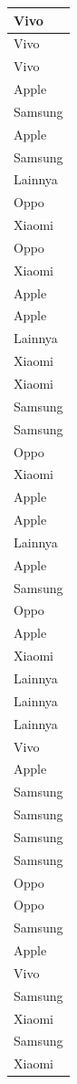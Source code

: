 \documentclass[
  letterpaper,
  DIV=11,
  numbers=noendperiod]{scrartcl}
\begin{document}
\begin{table}
\begin{tabular}[t]{l}
\hline
Vivo\\
\hline
Vivo\\
\hline
Vivo\\
\hline
Apple\\
\hline
Samsung\\
\hline
Apple\\
\hline
Samsung\\
\hline
Lainnya\\
\hline
Oppo\\
\hline
Xiaomi\\
\hline
Oppo\\
\hline
Xiaomi\\
\hline
Apple\\
\hline
Apple\\
\hline
Lainnya\\
\hline
Xiaomi\\
\hline
Xiaomi\\
\hline
Samsung\\
\hline
Samsung\\
\hline
Oppo\\
\hline
Xiaomi\\
\hline
Apple\\
\hline
Apple\\
\hline
Lainnya\\
\hline
Apple\\
\hline
Samsung\\
\hline
Oppo\\
\hline
Apple\\
\hline
Xiaomi\\
\hline
Lainnya\\
\hline
Lainnya\\
\hline
Lainnya\\
\hline
Vivo\\
\hline
Apple\\
\hline
Samsung\\
\hline
Samsung\\
\hline
Samsung\\
\hline
Samsung\\
\hline
Oppo\\
\hline
Oppo\\
\hline
Samsung\\
\hline
Apple\\
\hline
Vivo\\
\hline
Samsung\\
\hline
Xiaomi\\
\hline
Samsung\\
\hline
Xiaomi\\

\end{tabular}
\end{table}
\end{document}
